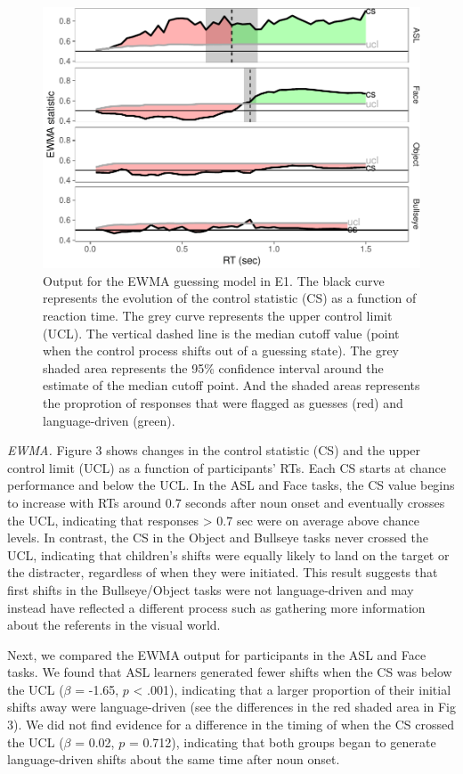 \documentclass[english,man]{apa6}
\theoremstyle{definition}
\theoremstyle{definition}
\theoremstyle{definition}
\theoremstyle{remark}
\begin{document}
\begin{figure}[tb]

{\centering \includegraphics[width=0.8\linewidth]{figs/trio-control-plot-1} 

}

\caption{Output for the EWMA guessing model in E1. The black curve represents the evolution of the control statistic (CS) as a function of reaction time. The grey curve represents the upper control limit (UCL). The vertical dashed line is the median cutoff value (point when the control process shifts out of a guessing state). The grey shaded area represents the 95\% confidence interval around the estimate of the median cutoff point. And the shaded areas represents the proprotion of responses that were flagged as guesses (red) and language-driven (green).}\label{fig:trio-control-plot}
\end{figure}

\emph{EWMA.} Figure 3 shows changes in the control statistic (CS) and
the upper control limit (UCL) as a function of participants' RTs. Each
CS starts at chance performance and below the UCL. In the ASL and Face
tasks, the CS value begins to increase with RTs around 0.7 seconds after
noun onset and eventually crosses the UCL, indicating that responses
\textgreater{} 0.7 sec were on average above chance levels. In contrast,
the CS in the Object and Bullseye tasks never crossed the UCL,
indicating that children's shifts were equally likely to land on the
target or the distracter, regardless of when they were initiated. This
result suggests that first shifts in the Bullseye/Object tasks were not
language-driven and may instead have reflected a different process such
as gathering more information about the referents in the visual world.

Next, we compared the EWMA output for participants in the ASL and Face
tasks. We found that ASL learners generated fewer shifts when the CS was
below the UCL (\(\beta\) = -1.65, \(p\) \textless{} .001), indicating
that a larger proportion of their initial shifts away were
language-driven (see the differences in the red shaded area in Fig 3).
We did not find evidence for a difference in the timing of when the CS
crossed the UCL (\(\beta\) = 0.02, \(p\) = 0.712), indicating that both
groups began to generate language-driven shifts about the same time
after noun onset.
\end{document}
